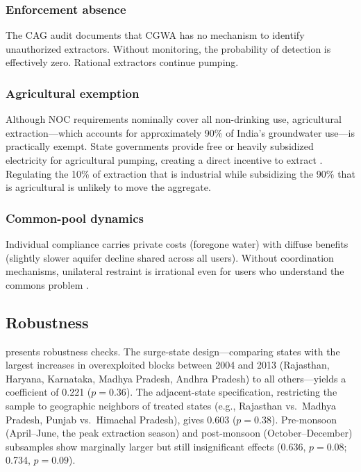 \documentclass[12pt]{article}
\begin{document}
\subsubsection*{Enforcement absence} The CAG audit documents that CGWA has no mechanism to identify unauthorized extractors. Without monitoring, the probability of detection is effectively zero. Rational extractors continue pumping.

\subsubsection*{Agricultural exemption} Although NOC requirements nominally cover all non-drinking use, agricultural extraction---which accounts for approximately 90\% of India's groundwater use---is practically exempt. State governments provide free or heavily subsidized electricity for agricultural pumping, creating a direct incentive to extract \citep{shah2009taming}. Regulating the 10\% of extraction that is industrial while subsidizing the 90\% that is agricultural is unlikely to move the aggregate.

\subsubsection*{Common-pool dynamics} Individual compliance carries private costs (foregone water) with diffuse benefits (slightly slower aquifer decline shared across all users). Without coordination mechanisms, unilateral restraint is irrational even for users who understand the commons problem \citep{ostrom1990governing}.

\subsection{Robustness}

 presents robustness checks. The surge-state design---comparing states with the largest increases in overexploited blocks between 2004 and 2013 (Rajasthan, Haryana, Karnataka, Madhya Pradesh, Andhra Pradesh) to all others---yields a coefficient of 0.221 ($p = 0.36$). The adjacent-state specification, restricting the sample to geographic neighbors of treated states (e.g., Rajasthan vs.\ Madhya Pradesh, Punjab vs.\ Himachal Pradesh), gives 0.603 ($p = 0.38$). Pre-monsoon (April--June, the peak extraction season) and post-monsoon (October--December) subsamples show marginally larger but still insignificant effects (0.636, $p = 0.08$; 0.734, $p = 0.09$).
\end{document}

